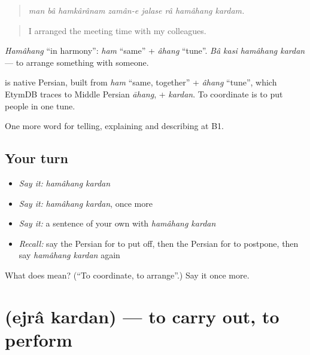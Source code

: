 \begin{quote}
\emph{man bâ hamkârânam zamân-e jalase râ hamâhang kardam.}
\end{quote}

\begin{quote}
I arranged the meeting time with my colleagues.
\end{quote}

\emph{Hamâhang} \textquotedblleft{}in harmony\textquotedblright{}: \emph{ham} \textquotedblleft{}same\textquotedblright{} + \emph{âhang} \textquotedblleft{}tune\textquotedblright{}. \emph{Bâ kasi hamâhang kardan} — to arrange something with someone.

\begin{cousinweb}
\textbf{ } is native Persian, built from \emph{ham} \textquotedblleft{}same, together\textquotedblright{} + \emph{âhang} \textquotedblleft{}tune\textquotedblright{}, which EtymDB traces to Middle Persian \emph{āhang}, + \emph{kardan}. To coordinate is to put people in one tune.
\end{cousinweb}

\begin{grammarlens}[title={What you've built}]
One more word for telling, explaining and describing at B1.
\end{grammarlens}

\subsection*{Your turn}
\begin{itemize}
\raggedright
  \item \emph{Say it:} \emph{hamâhang kardan}
  \item \emph{Say it:} \emph{hamâhang kardan}, once more
  \item \emph{Say it:} a sentence of your own with \emph{hamâhang kardan}
  \item \emph{Recall:} say the Persian for to put off, then the Persian for to postpone, then say \emph{hamâhang kardan} again
\end{itemize}

\begin{tcolorbox}[breakable,colback=teal!4,colframe=teal!35!black,title={Before you move on}]
What does   mean? (\textquotedblleft{}To coordinate, to arrange\textquotedblright{}.) Say it once more.
\end{tcolorbox}
\section[\texorpdfstring{\fa{اجرا} \fa{کردن} (ejrâ kardan)}{اجرا کردن (ejrâ kardan)}]{  (ejrâ kardan) — to carry out, to perform}


